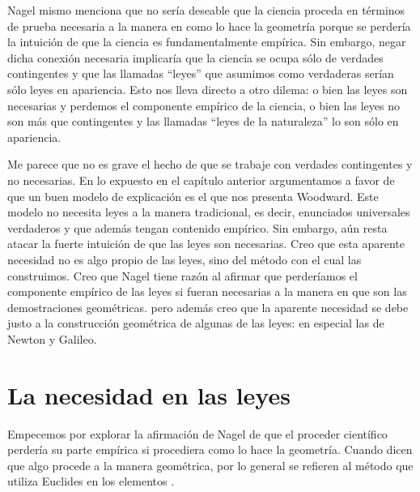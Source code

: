Nagel mismo menciona que no sería deseable que la ciencia proceda en términos de prueba necesaria a la manera en como lo hace la geometría \cite[cfr., p. 53]{Nagel2006} porque se perdería la intuición de que la ciencia es fundamentalmente empírica. Sin embargo, negar dicha conexión necesaria implicaría que la ciencia se ocupa sólo de verdades contingentes  y que las llamadas ``leyes'' que asumimos como verdaderas serían sólo leyes en apariencia. Esto nos lleva directo a otro dilema: o bien las leyes son necesarias y perdemos el componente empírico de la ciencia, o bien las leyes no son más que contingentes y las llamadas ``leyes de la naturaleza'' lo son sólo en apariencia.%

Me parece que no es grave el hecho de que se trabaje con verdades contingentes y no necesarias.%
En lo expuesto en el capítulo anterior argumentamos a favor de que un buen modelo de explicación es el que nos presenta Woodward. Este modelo no necesita leyes a la manera tradicional, es decir, enunciados universales verdaderos y que además tengan contenido empírico. Sin embargo, aún resta atacar la fuerte intuición de que las leyes son necesarias. Creo que esta aparente necesidad no es algo propio de las leyes, sino del método con el cual las construimos. Creo que Nagel tiene razón al afirmar que perderíamos el componente empírico de las leyes si fueran necesarias a la manera en que son las demostraciones geométricas. pero además creo que la aparente necesidad se debe justo a la construcción geométrica de algunas de las leyes: en especial las de Newton y Galileo.

\section{La necesidad en las leyes}

\noindent Empecemos por explorar la afirmación de Nagel de que el proceder científico perdería su parte empírica si procediera como lo hace la geometría. Cuando dicen que algo procede a la manera geométrica, por lo general se refieren al método que utiliza Euclides en los elementos \cite{Euclid2008}.

